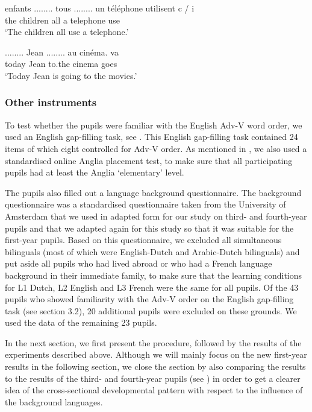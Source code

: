 \documentclass[output=paper,modfonts,nonflat, newtxmath]{langsci/langscibook}
\begin{document}
  \ea%
  \label{ex:stadt:4}
   {enfants} {........} tous {........} un téléphone utilisent  c / i\\
  	the children {}             all {}           a telephone use\\
  \glt ‘The children all use a telephone.’
  \z


  \ea%
  \label{ex:stadt:5}
   {........} {Jean} {........} {au} {cinéma.} {va} \\
 		 today {}          Jean {}           to.the cinema goes\\
  \glt ‘Today Jean is going to the movies.’
  \z


\subsubsection{{Other} {instruments} }
\label{sec:stadt:3.3.2}

To test whether the pupils were familiar with the English Adv-V word order, we used an English gap-filling task, see . This English gap-filling task contained 24 items of which eight controlled for Adv-V order. As mentioned in , we also used a standardised online Anglia placement test, to make sure that all participating pupils had at least the Anglia ‘elementary’ level.

The pupils also filled out a language background questionnaire. The background questionnaire was a standardised questionnaire taken from the University of Amsterdam that we used in adapted form for our study on third- and fourth-year pupils and that we adapted again for this study so that it was suitable for the first-year pupils. Based on this questionnaire, we excluded all simultaneous bilinguals (most of which were English-Dutch and Arabic-Dutch bilinguals) and put aside all pupils who had lived abroad or who had a French language background in their immediate family, to make sure that the learning conditions for L1 Dutch, L2 English and L3 French were the same for all pupils. Of the 43 pupils who showed familiarity with the Adv-V order on the English gap-filling task (see section 3.2), 20 additional pupils were excluded on these grounds. We used the data of the remaining 23 pupils.

  In the next section, we first present the procedure, followed by the results of the experiments described above. Although we will mainly focus on the new first-year results in the following section, we close the section by also comparing the results to the results of the third- and fourth-year pupils (see ) in order to get a clearer idea of the cross-sectional developmental pattern with respect to the influence of the background languages.
\end{document}
